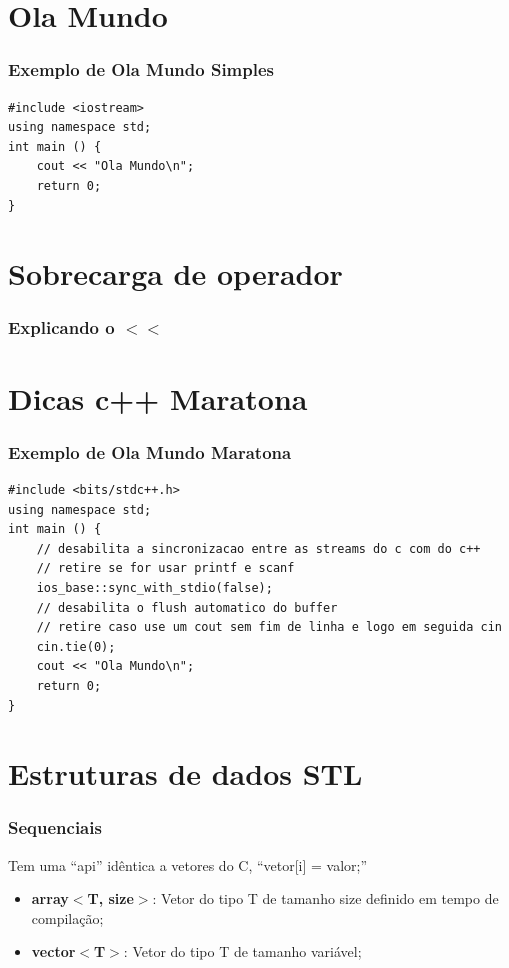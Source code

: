 \documentclass[12pt]{beamer}
\begin{document}
\section{Ola Mundo}\label{Ola Mundo}
\begin{frame}[t,fragile]{\insertsectionhead}
    \frametitle{Exemplo de Ola Mundo Simples}
    \begin{lstlisting}
#include <iostream>
using namespace std;
int main () {
    cout << "Ola Mundo\n";
    return 0;
}
    \end{lstlisting}
\end{frame}

\section{Sobrecarga de operador}\label{Sobrecarga de operador}
\begin{frame}
    \frametitle{Explicando o $<<$}
\end{frame}

\section{Dicas c++ Maratona}\label{Dicas c++ Maratona}
\begin{frame}[t,fragile]{\insertsectionhead}
    \frametitle{Exemplo de Ola Mundo Maratona}
    \begin{center}
    \begin{lstlisting}
#include <bits/stdc++.h>
using namespace std;
int main () {
    // desabilita a sincronizacao entre as streams do c com do c++
    // retire se for usar printf e scanf
    ios_base::sync_with_stdio(false);
    // desabilita o flush automatico do buffer
    // retire caso use um cout sem fim de linha e logo em seguida cin
    cin.tie(0);
    cout << "Ola Mundo\n";
    return 0;
}
    \end{lstlisting}
    \end{center}
\end{frame}

\section{Estruturas de dados STL}
\begin{frame}
    \frametitle{Sequenciais}

    Tem uma ``api'' idêntica a vetores do C, ``vetor[i] = valor;''

    \begin{itemize}
        \item\textbf{array$<$T, size$>$}: Vetor do tipo T de tamanho size definido em tempo de compilação;
        \item\textbf{vector$<$T$>$}: Vetor do tipo T de tamanho variável;
    \end{itemize}

\end{frame}
\end{document}
